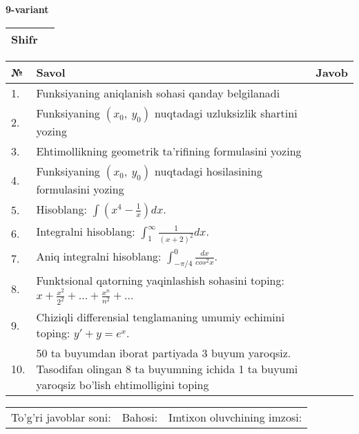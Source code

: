 \documentclass{article}
\begin{document}
  \egroup
  
  \newpage
  
  
  \textbf{9-variant}\\
  
  \bgroup
  \def\arraystretch{1.6} %
  
  \begin{tabular}{|m{5.7cm}|m{9.5cm}|}
  \hline
  Shifr & \\
  \hline
  \end{tabular}
  
  \vspace{1cm}
  
  \begin{tabular}{|m{0.7cm}|m{10cm}|m{4cm}|}
  \hline
  № & Savol & Javob \\
  \hline
  1. & Funksiyaning aniqlanish sohasi qanday belgilanadi &  \\
  \hline
  2. & Funksiyaning \((x_{0},\ y_{0})\) nuqtadagi uzluksizlik shartini yozing &  \\
  \hline
  3. & Ehtimollikning geometrik ta'rifining formulasini yozing &  \\
  \hline
  4. & Funksiyaning \((x_{0},\ y_{0})\) nuqtadagi hosilasining formulasini yozing &  \\
  \hline
  5. & Hisoblang: \(\int \left( x^{4} - \frac{1}{x} \right)dx\). &  \\
  \hline
  6. & Integralni hisoblang: \(\int_{1}^{\infty}{\frac{1}{(x + 2)^{2}}dx}\). &  \\
  \hline
  7. & Aniq integralni hisoblang: \(\int_{- \pi/4}^{0}\frac{dx}{cos^{2}x}\). &  \\
  \hline
  8. & Funktsional qatorning yaqinlashish sohasini toping: \(x + \frac{x^{2}}{2^{2}} + ... + \frac{x^{n}}{n^{2}} + ...\) &  \\
  \hline
  9. & Chiziqli differensial tenglamaning umumiy echimini toping: \(y' + y = e^{x}\). &  \\
  \hline
  10. & 50 ta buyumdan iborat partiyada 3 buyum yaroqsiz. Tasodifan olingan 8 ta buyumning ichida 1 ta buyumi yaroqsiz bo'lish ehtimolligini toping &  \\
  \hline
  \end{tabular}
  
  \vspace{1cm}
  
  \begin{tabular}{lll}
  To'g'ri javoblar soni: \underline{\hspace{1.5cm}} & 
  Bahosi: \underline{\hspace{1.5cm}} & 
  Imtixon oluvchining imzosi: \underline{\hspace{2cm}} \\
  \end{tabular}
  
\end{document}
